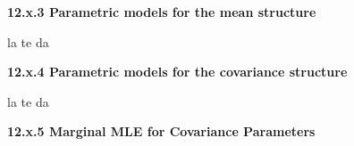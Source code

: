\documentclass[12pt, titlepage]{article}
\begin{document}
{\large \flushleft \textbf{12.x.3 Parametric models for the mean structure}}

la te da


{\large \flushleft \textbf{12.x.4 Parametric models for the covariance structure}}

la te da


\vspace{.5cm}
{\large \flushleft \textbf{12.x.5 Marginal MLE for Covariance Parameters}}
\vspace{.5cm}
\end{document}

